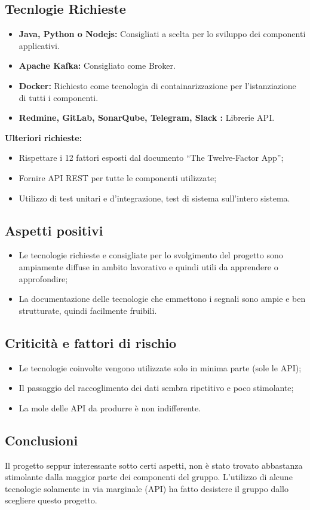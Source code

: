 \documentclass[a4paper, 11pt]{article}
\begin{document}
\subsection{Tecnlogie Richieste}
\begin{itemize}
\item \textbf{Java, Python o Nodejs:} Consigliati a scelta per lo sviluppo dei componenti applicativi.
\item \textbf{Apache Kafka:} Consigliato come Broker.
\item \textbf{Docker:} Richiesto come tecnologia di containarizzazione per l’istanziazione di tutti i componenti.
\item \textbf{Redmine, GitLab, SonarQube, Telegram, Slack :} Librerie API.
\end{itemize}
\textbf{Ulteriori richieste:}
\begin{itemize}
\item Rispettare i 12 fattori esposti dal documento “The Twelve-Factor App”;
\item Fornire API REST per tutte le componenti utilizzate;
\item Utilizzo di test unitari e d’integrazione, test di sistema sull’intero sistema.
\end{itemize}
\subsection{Aspetti positivi}
\begin{itemize}
\item Le tecnologie richieste e consigliate per lo svolgimento del progetto sono ampiamente diffuse in ambito lavorativo e quindi utili da apprendere o approfondire;
\item La documentazione delle tecnologie che emmettono i segnali sono ampie e ben strutturate, quindi facilmente fruibili.
\end{itemize}
\subsection{Criticità e fattori di rischio}
\begin{itemize}
\item Le tecnologie coinvolte vengono utilizzate solo in minima parte (sole le API);
\item Il passaggio del raccoglimento dei dati sembra ripetitivo e poco stimolante;
\item La mole delle API da produrre è non indifferente.
\end{itemize}
\subsection{Conclusioni}
Il progetto seppur interessante sotto certi aspetti, non è stato trovato abbastanza stimolante dalla maggior parte dei componenti del gruppo.
L’utilizzo di alcune tecnologie solamente in via marginale (API) ha fatto desistere il gruppo dallo scegliere questo progetto.
\end{document}
